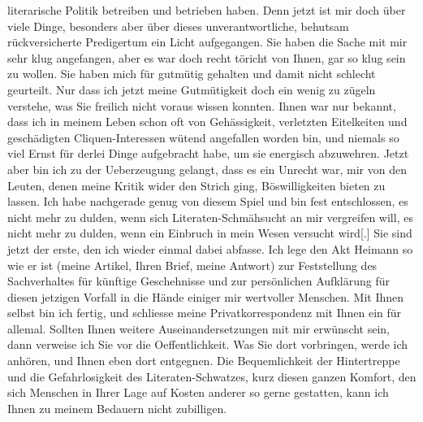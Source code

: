 \begin{ledgroupsized}[t]{13cm}
               literarische Politik betreiben und betrieben haben. Denn jetzt ist mir doch über
               viele Dinge, besonders aber über dieses unverantwortliche, behutsam rückversicherte
               Predigertum ein Licht aufgegangen.\pend
           \pstart
           Sie haben die Sache mit mir sehr klug angefangen, aber es war doch recht töricht von
               Ihnen, gar so klug sein zu wollen. Sie haben mich für gutmütig gehalten und damit
               nicht schlecht ge{\pb}urteilt. Nur
               dass ich jetzt meine Gutmütigkeit doch ein wenig zu zügeln verstehe, was Sie freilich
               nicht voraus wissen konnten. Ihnen war nur bekannt, dass ich in meinem Leben schon
               oft von Gehässigkeit, verletzten Eitelkeiten und geschädigten Cliquen-Interessen
               wütend angefallen worden bin, und niemals so viel Ernst für derlei Dinge aufgebracht
               habe, um sie energisch abzuwehren. Jetzt aber bin ich zu der Ueberzeugung gelangt,
               dass es ein Unrecht war, mir von den Leuten, denen meine Kritik wider den Strich
               ging, Böswilligkeiten bieten zu lassen. Ich habe nachgerade genug von diesem Spiel
               und bin fest entschlossen, es nicht mehr zu dulden, wenn sich Literaten-Schmähsucht
               an mir vergreifen will, es nicht mehr zu dulden, wenn ein Einbruch in mein Wesen
               versucht wird{[}.{]} Sie sind jetzt der erste, den ich wieder einmal
               dabei abfasse.\pend
           \pstart
           Ich lege den Akt Heimann so wie er ist (meine
                  Artikel, Ihren
               Brief, meine Antwort) zur Feststellung des Sachverhaltes für künftige Geschehnisse
               und zur persönlichen Aufklärung für diesen jetzigen Vorfall in die Hände einiger mir
               wertvoller Menschen.\pend
           \pstart
           Mit Ihnen selbst bin ich fertig, und schliesse meine Privatkorrespondenz mit Ihnen
               ein für allemal. Sollten Ihnen weitere Auseinandersetzungen mit mir erwünscht sein,
               dann verweise ich Sie vor die Oeffentlichkeit. Was Sie dort vorbringen, werde ich
               anhören, und Ihnen eben dort entgegnen. Die Bequemlichkeit der Hintertreppe und die
               Gefahrlosigkeit des Literaten-Schwatzes, kurz diesen ganzen Komfort, den sich
               Menschen in Ihrer Lage auf Kosten anderer so gerne gestatten, kann ich Ihnen zu
               meinem Bedauern nicht zubilligen.\pend
           
         
         \endnumbering{}\end{ledgroupsized}  \newcommand{\dateiname}{L03438}\newcommand{\titel}{Felix Salten an Arthur Schnitzler, 20. 4. 1907}\newcommand{\editorInnen}{Martin Anton Müller und Laura Untner}
      
